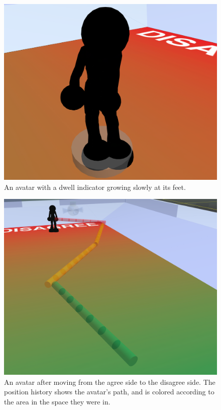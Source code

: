 \begin{figure}[tp]
	\includegraphics{figures/dwell-crop-lower.png}
	\caption{An avatar with a dwell indicator growing slowly at its feet.}
	\label{fig:information_space_dwell}
\end{figure}

\begin{figure}[tp]
	\includegraphics{figures/traces-lower.png}
	\caption{An avatar after moving from the agree side to the disagree side. The position history shows the avatar's path, and is colored according to the area in the space they were in.}
	\label{fig:information_space_traces}
\end{figure}

